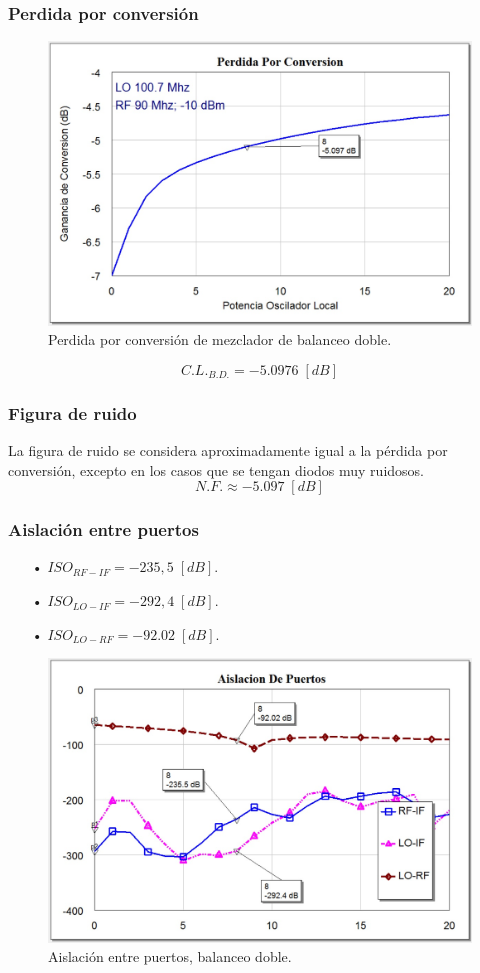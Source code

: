 \documentclass[twocolumn]{article}
\begin{document}
\subsubsection{Perdida por conversión}
%
\begin{figure}[h]
  \centering    
	\includegraphics[scale=0.3]{imagenes/CL3.jpg}
	\caption{Perdida por conversión de mezclador de balanceo doble.}\label{fig:CL3}
\end{figure}
\[C.L._{B.D.} = -5.097 6 \; [dB] \]
%
\subsubsection{Figura de ruido}
%
La figura de ruido se considera aproximadamente igual a la pérdida por conversión, excepto en los casos que se tengan diodos muy ruidosos.
\[N.F. \approx -5.097 \; [dB] \]
%
\subsubsection{Aislación entre puertos}
%
\begin{itemize}\itemsep0em
\item[•]  $ISO_{RF-IF} = -235,5 \; [dB]$.
\item[•]  $ISO_{LO-IF} = -292,4 \; [dB]$.
\item[•]  $ISO_{LO-RF} = -92.02 \; [dB]$.
\end{itemize}
%
\begin{figure}[h]
  \centering    
	\includegraphics[scale=0.3]{imagenes/ISO3.jpg}
	\caption{Aislación entre puertos, balanceo doble.}\label{fig:ISO3}
\end{figure}
\clearpage
%
\end{document}
